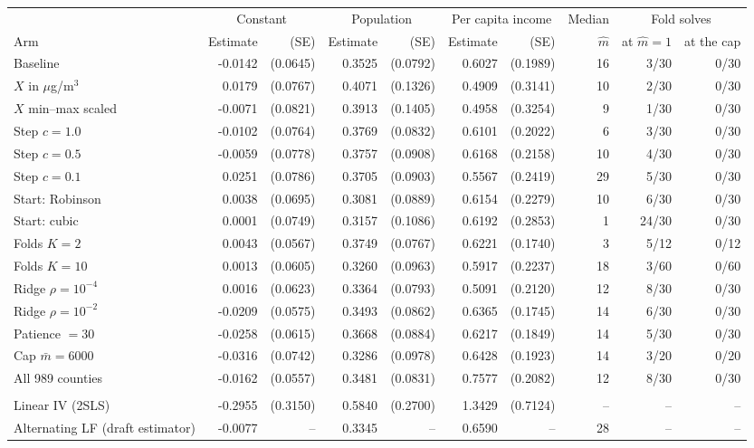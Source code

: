\begin{tabular}{lrrrrrrrrr}
\toprule
& \multicolumn{2}{c}{Constant} & \multicolumn{2}{c}{Population} & \multicolumn{2}{c}{Per capita income} & Median & \multicolumn{2}{c}{Fold solves} \\
\cmidrule(lr){2-3} \cmidrule(lr){4-5} \cmidrule(lr){6-7} \cmidrule(lr){9-10}
Arm & Estimate & (SE) & Estimate & (SE) & Estimate & (SE) & $\hat m$ & at $\hat m = 1$ & at the cap \\
\midrule
Baseline & -0.0142 & (0.0645) & 0.3525 & (0.0792) & 0.6027 & (0.1989) & 16 & 3/30 & 0/30 \\
$X$ in $\mu$g/m$^3$ & 0.0179 & (0.0767) & 0.4071 & (0.1326) & 0.4909 & (0.3141) & 10 & 2/30 & 0/30 \\
$X$ min--max scaled & -0.0071 & (0.0821) & 0.3913 & (0.1405) & 0.4958 & (0.3254) & 9 & 1/30 & 0/30 \\
Step $c = 1.0$ & -0.0102 & (0.0764) & 0.3769 & (0.0832) & 0.6101 & (0.2022) & 6 & 3/30 & 0/30 \\
Step $c = 0.5$ & -0.0059 & (0.0778) & 0.3757 & (0.0908) & 0.6168 & (0.2158) & 10 & 4/30 & 0/30 \\
Step $c = 0.1$ & 0.0251 & (0.0786) & 0.3705 & (0.0903) & 0.5567 & (0.2419) & 29 & 5/30 & 0/30 \\
Start: Robinson & 0.0038 & (0.0695) & 0.3081 & (0.0889) & 0.6154 & (0.2279) & 10 & 6/30 & 0/30 \\
Start: cubic & 0.0001 & (0.0749) & 0.3157 & (0.1086) & 0.6192 & (0.2853) & 1 & 24/30 & 0/30 \\
Folds $K = 2$ & 0.0043 & (0.0567) & 0.3749 & (0.0767) & 0.6221 & (0.1740) & 3 & 5/12 & 0/12 \\
Folds $K = 10$ & 0.0013 & (0.0605) & 0.3260 & (0.0963) & 0.5917 & (0.2237) & 18 & 3/60 & 0/60 \\
Ridge $\rho = 10^{-4}$ & 0.0016 & (0.0623) & 0.3364 & (0.0793) & 0.5091 & (0.2120) & 12 & 8/30 & 0/30 \\
Ridge $\rho = 10^{-2}$ & -0.0209 & (0.0575) & 0.3493 & (0.0862) & 0.6365 & (0.1745) & 14 & 6/30 & 0/30 \\
Patience $= 30$ & -0.0258 & (0.0615) & 0.3668 & (0.0884) & 0.6217 & (0.1849) & 14 & 5/30 & 0/30 \\
Cap $\bar m = 6000$ & -0.0316 & (0.0742) & 0.3286 & (0.0978) & 0.6428 & (0.1923) & 14 & 3/20 & 0/20 \\
All 989 counties & -0.0162 & (0.0557) & 0.3481 & (0.0831) & 0.7577 & (0.2082) & 12 & 8/30 & 0/30 \\
\addlinespace
\multicolumn{10}{l}{\textit{Comparison estimators}} \\
Linear IV (2SLS) & -0.2955 & (0.3150) & 0.5840 & (0.2700) & 1.3429 & (0.7124) & -- & -- & -- \\
Alternating LF (draft estimator) & -0.0077 & -- & 0.3345 & -- & 0.6590 & -- & 28 & -- & -- \\
\bottomrule
\end{tabular}
